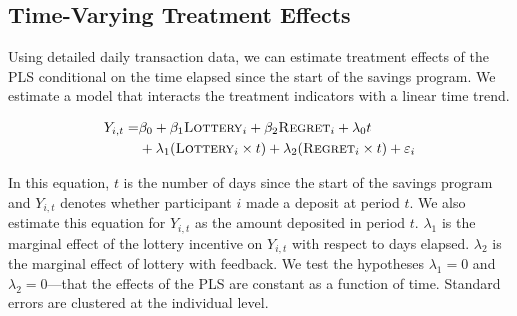 \documentclass[12pt]{article}
\begin{document}
	\subsection{Time-Varying Treatment Effects}

		Using detailed daily transaction data, we can estimate treatment effects of the PLS conditional on the time elapsed since the start of the savings program. We estimate a model that interacts the treatment indicators with a linear time trend.

		\begin{equation} \begin{split}
		Y_{i,t} = & \beta_{0} + \beta_{1}\text{\textsc{Lottery}}_{i} + \beta_{2}\text{\textsc{Regret}}_{i} + \lambda_{0}t \\
					& + \lambda_{1}(\text{\textsc{Lottery}}_{i} \times t) + \lambda_{2}(\text{\textsc{Regret}}_{i} \times t) + \varepsilon_{i}
		\end{split} \label{eq:timelinear} \end{equation}

		In this equation, $t$ is the number of days since the start of the savings program and $Y_{i,t}$ denotes whether participant $i$ made a deposit at period $t$. We also estimate this equation for $Y_{i,t}$ as the amount deposited in period $t$. $\lambda_1$ is the marginal effect of the lottery incentive on $Y_{i,t}$ with respect to days elapsed. $\lambda_2$ is the marginal effect of lottery with feedback. We test the hypotheses $\lambda_1 = 0$ and $\lambda_2 = 0$---that the effects of the PLS are constant as a function of time. Standard errors are clustered at the individual level.


\end{document}
